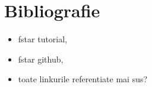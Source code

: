 \chapter*{Bibliografie} 



\begin{itemize}
    \item fstar tutorial, 
    \item fstar github, 
    \item toate linkurile referentiate mai sus?
\end{itemize}